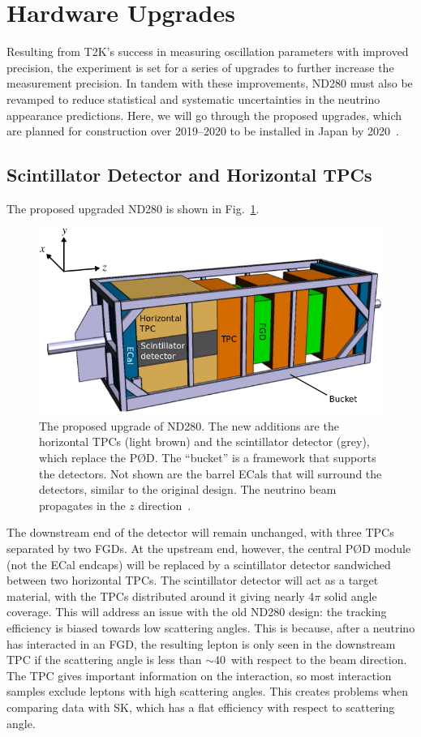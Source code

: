 \documentclass[aps,pra,12pt,notitlepage,tightenlines]{revtex4-1}
\begin{document}
\section{Hardware Upgrades}
Resulting from T2K's success in measuring oscillation parameters with improved precision, the experiment is set for a series of upgrades to further increase the measurement precision. In tandem with these improvements, ND280 must also be revamped to reduce statistical and systematic uncertainties in the neutrino appearance predictions. Here, we will go through the proposed upgrades, which are planned for construction over 2019--2020 to be installed in Japan by 2020~\cite{Blondel:2299599}.

\subsection{Scintillator Detector and Horizontal TPCs}
The proposed upgraded ND280 is shown in Fig.\ \ref{fig:up}.
\begin{figure}
 \includegraphics[scale=0.5]{upgrade2.png}
 \caption{The proposed upgrade of ND280. The new additions are the horizontal TPCs (light brown) and the scintillator detector (grey), which replace the P\O D. The ``bucket'' is a framework that supports the detectors. Not shown are the barrel ECals that will surround the detectors, similar to the original design. The neutrino beam propagates in the $z$ direction~\cite{Blondel:2299599}.}
 \label{fig:up}
\end{figure}
The downstream end of the detector will remain unchanged, with three TPCs separated by two FGDs. At the upstream end, however, the central P\O D module (not the ECal endcaps) will be replaced by a scintillator detector sandwiched between two horizontal TPCs. The scintillator detector will act as a target material, with the TPCs distributed around it giving nearly 4$\pi$ solid angle coverage. This  will address an issue with the old ND280 design: the tracking efficiency is biased towards low scattering angles. This is because, after a neutrino has interacted in an FGD, the resulting lepton is only seen in the downstream TPC if the scattering angle is less than $\sim$40\degree\ with respect to the beam direction. The TPC gives important information on the interaction, so most interaction samples exclude leptons with high scattering angles. This creates problems when comparing data with SK, which has a flat efficiency with respect to scattering angle.
\end{document}

